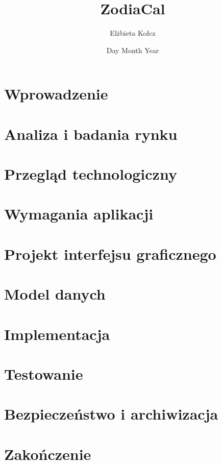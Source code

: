 \documentclass[12pt]{report}
\title{ZodiaCal}
\author{Elżbieta Kołcz}
\date{Day Month Year}
\begin{document}


\chapter*{Wprowadzenie}


\chapter*{Analiza i badania rynku}


\chapter*{Przegląd technologiczny}


\chapter*{Wymagania aplikacji}


\chapter*{Projekt interfejsu graficznego}


\chapter*{Model danych}


\chapter*{Implementacja}


\chapter*{Testowanie}


\chapter*{Bezpieczeństwo i archiwizacja}


\chapter*{Zakończenie}


\tableofcontents

\listoffigures
\listoftables

\printbibliography[heading=bibintoc, title={Bibliografia}]
\end{document}
